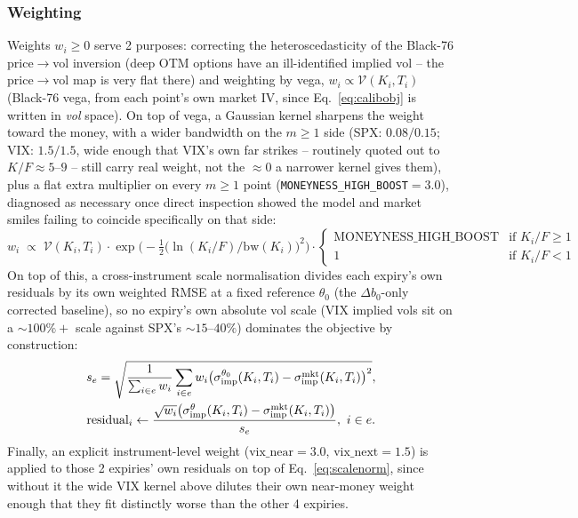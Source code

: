 \documentclass[11pt]{article}
\begin{document}
\subsubsection{Weighting}
\label{sec:weighting}
Weights $w_i\ge0$ serve 2 purposes: correcting the heteroscedasticity
of the Black-76 price$\to$vol inversion (deep OTM options have an
ill-identified implied vol -- the price$\to$vol map is very flat
there) and weighting by vega, $w_i\propto\mathcal V(K_i,T_i)$ (Black-76
vega, from each point's own market IV, since Eq.~\eqref{eq:calibobj}
is written in \emph{vol} space). On top of vega, a Gaussian kernel
sharpens the weight toward the money, with a wider bandwidth on the
$m\ge1$ side (SPX: $0.08/0.15$; VIX: $1.5/1.5$, wide enough that VIX's
own far strikes -- routinely quoted out to $K/F\approx5$--$9$ -- still
carry real weight, not the $\approx0$ a narrower kernel gives them),
plus a flat extra multiplier on every $m\ge1$ point
(\texttt{MONEYNESS\_HIGH\_BOOST}$=3.0$), diagnosed as necessary once
direct inspection showed the model and market smiles failing to
coincide specifically on that side:
\begin{equation}
w_i \;\propto\; \mathcal V(K_i,T_i)\cdot
\exp\!\Big(-\tfrac12\big(\ln(K_i/F)/\text{bw}(K_i)\big)^2\Big)\cdot
\begin{cases}
\text{MONEYNESS\_HIGH\_BOOST} & \text{if } K_i/F\ge1 \\
1 & \text{if } K_i/F<1
\end{cases}
\label{eq:atmweight}
\end{equation}
On top of this, a cross-instrument scale normalisation divides each
expiry's own residuals by its own weighted RMSE at a fixed reference
$\theta_0$ (the $\Delta b_0$-only corrected baseline), so no expiry's
own absolute vol scale (VIX implied vols sit on a $\sim100\%+$ scale
against SPX's $\sim15$--$40\%$) dominates the objective by construction:
\begin{gather}
s_e = \sqrt{\frac{1}{\sum_{i\in e}w_i}\sum_{i\in e}w_i\big(\sigma_{\text{imp}}^{\theta_0}(K_i,T_i)-\sigma_{\text{imp}}^{\text{mkt}}(K_i,T_i)\big)^2},
\notag \\
\text{residual}_i \leftarrow \frac{\sqrt{w_i}\big(\sigma_{\text{imp}}^\theta(K_i,T_i)-\sigma_{\text{imp}}^{\text{mkt}}(K_i,T_i)\big)}{s_e},\ i\in e.
\label{eq:scalenorm}
\end{gather}
Finally, an explicit instrument-level weight
($\text{vix\_near}=3.0$, $\text{vix\_next}=1.5$) is applied to those
2 expiries' own residuals on top of Eq.~\eqref{eq:scalenorm}, since
without it the wide VIX kernel above dilutes their own near-money
weight enough that they fit distinctly worse than the other 4
expiries.
\end{document}
